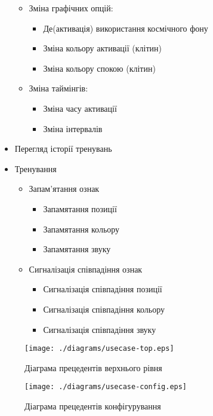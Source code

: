 \begin{itemize}
\begin{itemize}[leftmargin=24pt]
      \item Зміна графічних опцій:
        \begin{itemize}[leftmargin=24pt]
          \item Де(активація) використання космічного фону
          \item Зміна кольору активації (клітин)
          \item Зміна кольору спокою (клітин)
        \end{itemize}
      \item Зміна таймінгів:
        \begin{itemize}[leftmargin=24pt]
          \item Зміна часу активації
          \item Зміна інтервалів
        \end{itemize}
    \end{itemize}
  \item Перегляд історії тренувань
  \item Тренування
    \begin{itemize}[leftmargin=24pt]
      \item Запам'ятання ознак
        \begin{itemize}
          \item Запамятання позиції
          \item Запамятання кольору
          \item Запамятання звуку
        \end{itemize}
      \item Сигналізація співпадіння ознак
        \begin{itemize}[leftmargin=24pt]
          \item Сигналізація співпадіння позиції
          \item Сигналізація співпадіння кольору
          \item Сигналізація співпадіння звуку
        \end{itemize}
    \end{itemize}
\end{itemize}

\begin{figure}[here]
  \centering\texttt{[image: ./diagrams/usecase-top.eps]}
  \caption{Діаграма прецедентів верхнього рівня}
\end{figure}

\begin{figure}[here]
  \centering\texttt{[image: ./diagrams/usecase-config.eps]}
  \caption{Діаграма прецедентів конфігурування}
\end{figure}


